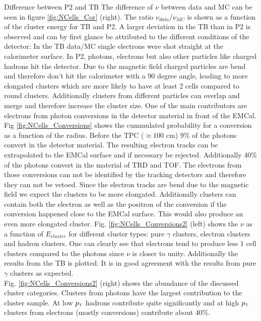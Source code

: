 \documentclass[ALICE]{ALICE_analysis_notes}
\newcommand{\pT}{$p_{\mbox{\tiny T}}$\xspace}
\begin{document}
\begin{section}{Difference between P2 and TB}
The difference of $\nu$ between data and MC can be seen in figure \ref{fig:NCells_Cor} (right). The ratio $\nu_{data}/\nu_{MC}$ is shown as a function of the cluster energy for TB and P2. A larger deviation in the TB than in P2 is observed and can by first glance be attributed to the different conditions of the detector: In the TB data/MC single electrons were shot straight at the calorimeter surface. In P2, photons, electrons but also other particles like charged hadrons hit the detector. Due to the magnetic field charged particles are bend and therefore don't hit the calorimeter with a 90 degree angle, leading to more elongated clusters which are more likely to have at least 2 cells compared to round clusters. Additionally clusters from different particles can overlap and merge and therefore increase the cluster size. One of the main contributors are electrons from photon conversions in the detector material in front of the EMCal. Fig \ref{fig:NCells_Conversions} shows the cummulated  probability for a conversion as a function of the radius. Before the TPC ($\approx 100$ cm) 9\% of the photons convert in the detector material. The resulting electron tracks can be extrapolated to the EMCal surface and if necessary be rejected.  Additionally 40\% of the photons convert in the material of TRD and TOF. The electrons from those conversions can not be identified by the tracking detectors and therefore they can not be vetoed. Since the electron tracks are bend due to the magnetic field we expect the clusters to be more elongated. Additionally clusters can contain both the electron as well as the positron of the conversion if the conversion happened close to the EMCal surface. This would also produce an even more elongated cluster. Fig. \ref{fig:NCells_Conversions2} (left) shows the $\nu$ as a function of $E_{cluster}$ for different cluster types: pure $\gamma$ clusters, electron clusters and hadron clusters. One can clearly see that electrons tend to produce less 1 cell clusters compared to the photons since $\nu$ is closer to unity. Additionally the results from the TB is plotted. It is in good agreement with the results from pure $\gamma$ clusters as expected.\\
Fig. \ref{fig:NCells_Conversions2} (right) shows the abundance of the discussed cluster categories. Clusters from photons have the largest contribution to the cluster sample. At low \pT hadrons contribute quite significantly and at high \pT clusters from electrons (mostly conversions) contribute about 40\%.\\


\end{section}
\end{document}
